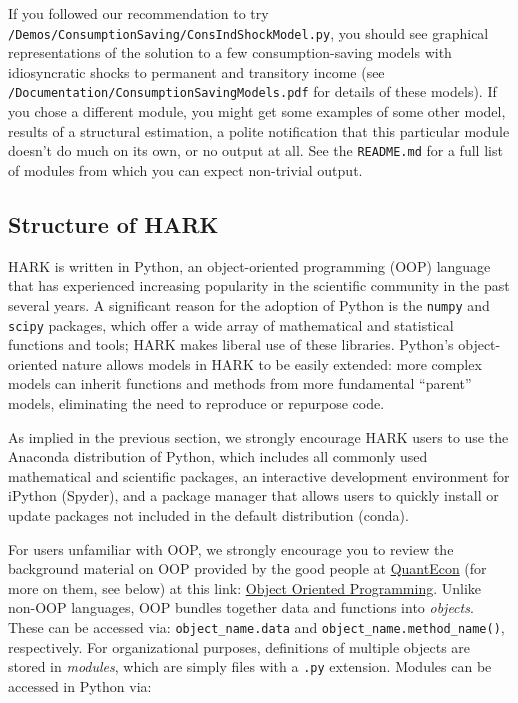 \documentclass[12pt,titlepage,letterpaper]{econtex}
\begin{document}
{If you followed our recommendation to try \texttt{/Demos/ConsumptionSaving/ConsIndShockModel.py}, you should see graphical representations of the solution to a few consumption-saving models with idiosyncratic shocks to permanent and transitory income (see \texttt{/Documentation/ConsumptionSavingModels.pdf} for details of these models).  If you chose a different module, you might get some examples of some other model, results of a structural estimation, a polite notification that this particular module doesn't do much on its own, or no output at all.  See the \texttt{README.md} for a full list of modules from which you can expect non-trivial output.

\subsection{Structure of HARK}\label{sec:StructureOfHARK}

HARK is written in Python, an object-oriented programming (OOP) language that has experienced increasing popularity in the scientific community in the past several years.  A significant reason for the adoption of Python is the \texttt{numpy} and \texttt{scipy} packages, which offer a wide array of mathematical and statistical functions and tools; HARK makes liberal use of these libraries.  Python's object-oriented nature allows models in HARK to be easily extended: more complex models can inherit functions and methods from more fundamental ``parent'' models, eliminating the need to reproduce or repurpose code.

As implied in the previous section, we strongly encourage HARK users to use the Anaconda distribution of Python, which includes all commonly used mathematical and scientific packages, an interactive development environment for iPython (Spyder), and a package manager that allows users to quickly install or update packages not included in the default distribution (conda).

For users unfamiliar with OOP, we strongly encourage you to review the background material on OOP provided by the good people at \href{http://quant-econ.net/}{QuantEcon} (for more on them, see below) at this link: \href{http://quant-econ.net/py/python_oop.html}{Object Oriented Programming}. Unlike non-OOP languages, OOP bundles together data and functions into \textit{objects}. These can be accessed via: \texttt{object\_name.data} and \texttt{object\_name.method\_name()}, respectively. For organizational purposes, definitions of multiple objects are stored in \textit{modules}, which are simply files with a \texttt{.py} extension. Modules can be accessed in Python via:\\

}
\end{document}
